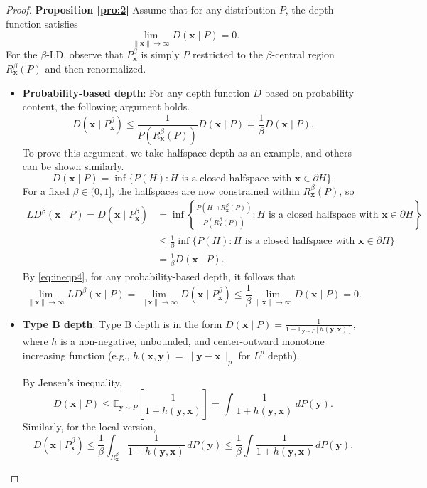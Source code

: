 \documentclass[final,3p,times]{elsarticle}
\newcommand{\vecx}{\mathbf{x}}
\newcommand{\vecy}{\mathbf{y}}
\begin{document}
\begin{proof}\textbf{Proposition \ref{pro:2}}
Assume that for any distribution $P$, the depth function satisfies
\[
\lim_{\|\vecx\| \to \infty} D(\vecx \mid P) = 0.
\]
For the $\beta$-LD, observe that $P^\beta_{\vecx}$ is simply $P$ restricted to the $\beta$-central region $R^\beta_{\vecx}(P)$ and then renormalized. 
\begin{itemize}
    \item \textbf{Probability-based depth}: For any depth function $D$ based on probability content, the following argument holds.
\begin{equation}\label{eq:ineqp4}
D(\vecx\mid P^\beta_{\vecx}) \le \frac{1}{P(R^\beta_{\vecx}(P))} D(\vecx\mid P) = \frac{1}{\beta} D(\vecx\mid P).
\end{equation}
To prove this argument, we take halfspace depth as an example, and others can be shown similarly.
\[
D(\vecx\mid P) = \inf\{P(H) : H \text{ is a closed halfspace with } \vecx \in \partial H\}.
\]
For a fixed $\beta \in (0,1]$, the halfspaces are now constrained within $R^\beta_{\vecx}(P)$, so
\begin{align*}
    LD^\beta(\vecx\mid P) = D(\vecx\mid P^\beta_{\vecx}) 
    &= \inf\left\{\frac{P(H \cap R^\beta_{\vecx}(P))}{P(R^\beta_{\vecx}(P))} : H \text{ is a closed halfspace with } \vecx \in \partial H\right\} \\
    &\le \frac{1}{\beta} \inf\{P(H) : H \text{ is a closed halfspace with } \vecx \in \partial H\} \\
    &= \frac{1}{\beta} D(\vecx\mid P).
\end{align*}
By \eqref{eq:ineqp4}, for any probability-based depth, it follows that
\[
\lim_{\|\vecx\| \to \infty} LD^\beta(\vecx \mid P) = \lim_{\|\vecx\| \to \infty} D(\vecx \mid P^\beta_{\vecx}) \leq \frac{1}{\beta}\lim_{\|\vecx\| \to \infty} D(\vecx\mid P) = 0.
\]
\item \textbf{Type B depth}: Type B depth is in the form
$
D(\vecx\mid P) = \frac{1}{1 + \mathbb{E}_{\vecy \sim P}[h(\vecy, \vecx)]},
$
where $h$ is a non-negative, unbounded, and center-outward monotone increasing function (e.g., $h(\vecx, \vecy)=\|\vecy-\vecx\|_p$ for $L^p$ depth).

By Jensen’s inequality,
\[
D(\vecx\mid P)\leq \mathbb{E}_{\vecy \sim P}\left[\frac{1}{1 + h(\vecy, \vecx)}\right]=\int \frac{1}{1 + h(\vecy, \vecx)}\, dP(\vecy).
\]
Similarly, for the local version,
\[
D(\vecx \mid P^\beta_\vecx) \leq \frac{1}{\beta}\int_{R^\beta_\vecx} \frac{1}{1 + h(\vecy, \vecx)}\, dP(\vecy) \leq \frac{1}{\beta}\int \frac{1}{1 + h(\vecy, \vecx)}\, dP(\vecy).
\]


\end{itemize}
\end{proof}
\end{document}
